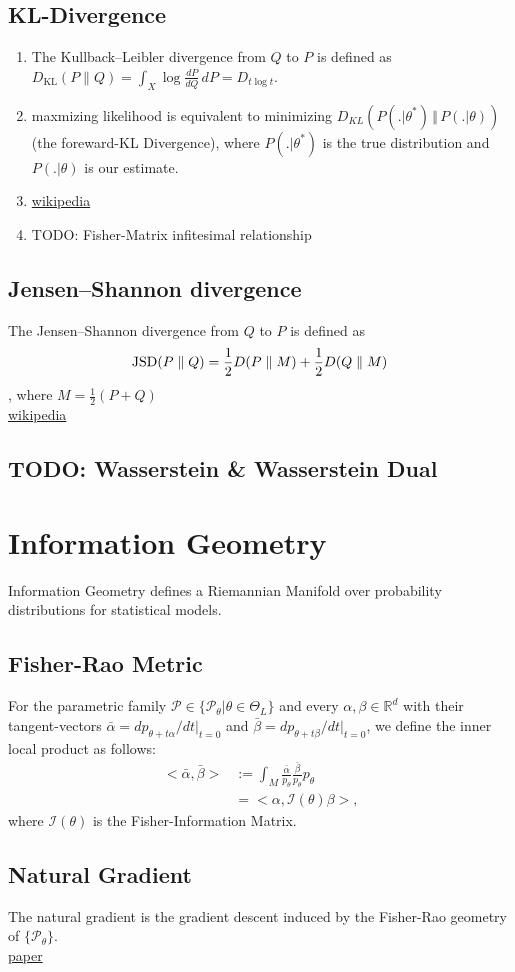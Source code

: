 \subsection{KL-Divergence}
\begin{enumerate}
	\item The Kullback–Leibler divergence from $Q$ to $P$ is defined as\\
	$D_{\mathrm {KL} }(P\|Q)=\int _{X}\log {\frac {dP}{dQ}}\,dP=D_{t\log t}$.
	\item maxmizing likelihood is equivalent to minimizing $D_{KL}(P(. \vert \theta^{\ast}) \, \Vert \, P(. \vert \theta))$ (the foreward-KL Divergence), where $P(. \vert \theta^{\ast})$ is the true distribution and $P(. \vert \theta)$ is our estimate.
	\item \href{https://en.wikipedia.org/wiki/Kullback–Leibler_divergence}{wikipedia}
	\item TODO: Fisher-Matrix infitesimal relationship
\end{enumerate}

\subsection{Jensen–Shannon divergence}
The Jensen–Shannon divergence from $Q$ to $P$ is defined as
\begin{align*}
	{{\rm {JSD}}}(P\parallel Q)={\frac  {1}{2}}D(P\parallel M)+{\frac  {1}{2}}D(Q\parallel M)
\end{align*}, where $M={\frac  {1}{2}}(P+Q)$\\
\href{https://en.wikipedia.org/wiki/Jensen–Shannon_divergence}{wikipedia}

\subsection{TODO: Wasserstein \& Wasserstein Dual}

\section{Information Geometry}
Information Geometry defines a Riemannian Manifold over probability distributions for statistical models.\\
\subsection{Fisher-Rao Metric}
For the parametric family $\mathcal{P} \in \{ \mathcal{P}_\theta | \theta \in \Theta_L\}$ and every $\alpha, \beta \in \mathbb{R}^d$ with their tangent-vectors $\bar{\alpha}=dp_{\theta + t\alpha}/dt|_{t=0}$ and $\bar{\beta}=dp_{\theta + t\beta}/dt|_{t=0}$, we define the inner local product as follows:
\begin{align*}
	<\bar{\alpha}, \bar{\beta}> &:= \int_M\frac{\bar{\alpha}}{p_\theta}\frac{\bar{\beta}}{p_\theta}p_\theta\\
	&=<\alpha, \mathcal{I}(\theta)\beta>\text{,}
\end{align*}
where $\mathcal{I}(\theta)$ is the Fisher-Information Matrix.
\subsection{Natural Gradient}
The natural gradient is the gradient descent induced by the Fisher-Rao geometry of $\{\mathcal{P}_\theta \}$.\\
\href{https://arxiv.org/abs/1711.01530}{paper}